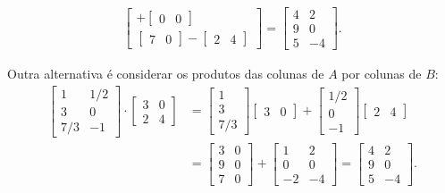 \documentclass[12pt,a4paper]{article}
\begin{document}
\begin{enumerate}
\begin{enumerate}
\begin{align*}
\begin{bmatrix}
+
\begin{bmatrix}
0 & 0
\end{bmatrix}\\
\begin{bmatrix}
7 & 0
\end{bmatrix}
-
\begin{bmatrix}
2 & 4
\end{bmatrix}
\end{bmatrix}
=
\begin{bmatrix}
4 & 2 \\
9 & 0 \\
5 & -4
\end{bmatrix}.
\end{align*}

Outra alternativa é considerar os produtos das colunas de $A$ por colunas de $B$:
\begin{align*}
\begin{bmatrix}
  1 & 1/2 \\
  3 & 0 \\
7/3 & -1
\end{bmatrix}
\cdot
\begin{bmatrix}
3 & 0 \\
2 & 4
\end{bmatrix}
& =
\begin{bmatrix}
1 \\
3 \\
7/3
\end{bmatrix}
\begin{bmatrix}
3 & 0
\end{bmatrix}
+
\begin{bmatrix}
1/2 \\
0 \\
-1
\end{bmatrix}
\begin{bmatrix}
2 & 4
\end{bmatrix} \\
& =
\begin{bmatrix}
3 & 0 \\
9 & 0 \\
7 & 0
\end{bmatrix}
+
\begin{bmatrix}
 1 & 2\\
 0 & 0\\
-2 & -4
\end{bmatrix}
=
\begin{bmatrix}
4 & 2 \\
9 & 0 \\
5 & -4
\end{bmatrix}.
\end{align*}


\end{enumerate}
\end{enumerate}
\end{document}

